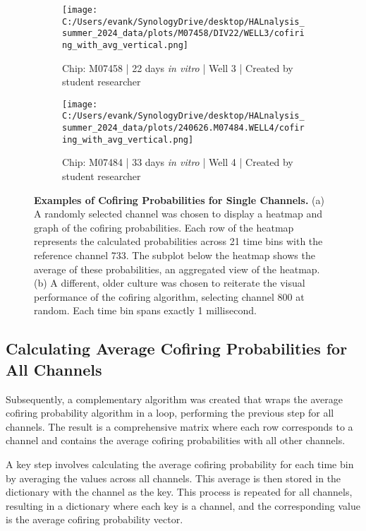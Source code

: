 \documentclass{article} %
\begin{document}
\begin{figure}
    \centering
    \begin{subfigure}[b]{0.48\textwidth}
        \centering
        \texttt{[image: C:/Users/evank/SynologyDrive/desktop/HALnalysis\_summer\_2024\_data/plots/M07458/DIV22/WELL3/cofiring\_with\_avg\_vertical.png]}
        \caption{Chip: M07458 | 22 days \textit{in vitro} | Well 3 | Created by student researcher}
    \end{subfigure}
    \hspace{\fill}
    \begin{subfigure}[b]{0.48\textwidth}
        \centering
        \texttt{[image: C:/Users/evank/SynologyDrive/desktop/HALnalysis\_summer\_2024\_data/plots/240626.M07484.WELL4/cofiring\_with\_avg\_vertical.png]}
        \caption{Chip: M07484 | 33 days \textit{in vitro} | Well 4 | Created by student researcher}
    \end{subfigure}
    \caption{\textbf{Examples of Cofiring Probabilities for Single Channels.} (a) A randomly selected channel was chosen to display a heatmap and graph of the cofiring probabilities. Each row of the heatmap represents the calculated probabilities across 21 time bins with the reference channel 733. The subplot below the heatmap shows the average of these probabilities, an aggregated view of the heatmap. (b) A different, older culture was chosen to reiterate the visual performance of the cofiring algorithm, selecting channel 800 at random. Each time bin spans exactly 1 millisecond.}
\end{figure}


\subsection{Calculating Average Cofiring Probabilities for All Channels}
Subsequently, a complementary algorithm was created that wraps the average cofiring probability algorithm in a loop, performing the previous step for all channels. The result is a comprehensive matrix where each row corresponds to a channel and contains the average cofiring probabilities with all other channels.

A key step involves calculating the average cofiring probability for each time bin by averaging the values across all channels. This average is then stored in the dictionary with the channel as the key. This process is repeated for all channels, resulting in a dictionary where each key is a channel, and the corresponding value is the average cofiring probability vector.
\end{document}
